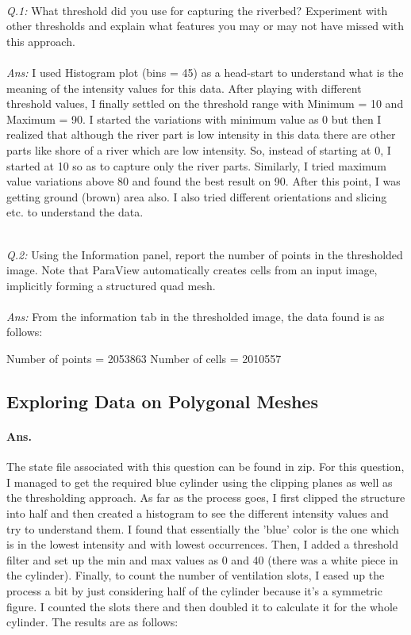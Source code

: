 \documentclass[a4paper,11pt]{article}
\theoremstyle{mytheor}
\begin{document}
\clearpage
\textit{\\ Q.1:} What threshold did you use for capturing the riverbed? Experiment with other thresholds and explain what features you may or may not have missed with this approach. \\ \\
\textit{Ans:} I used Histogram plot (bins = 45) as a head-start to understand what is the meaning of the intensity values for this data. After playing with different threshold values, I  finally settled on the threshold range with Minimum = 10 and Maximum = 90. I started the variations with minimum value as 0 but then I realized that although the river part is low intensity in this data there are other parts like shore of a river which are low intensity. So, instead of starting at 0, I started at 10 so as to capture only the river parts. Similarly, I tried maximum value variations above 80 and found the best result on 90. After this point, I was getting ground (brown) area also. I also tried different orientations and slicing etc. to understand the data. 

\textit{\\ Q.2:} Using the Information panel, report the number of points in the thresholded image. Note that ParaView automatically creates cells from an input image, implicitly forming a structured quad mesh. \\ \\
\textit{Ans:} From the information tab in the thresholded image, the data found is as follows:

Number of points = 2053863
Number of cells = 2010557

\clearpage

\subsection{Exploring Data on Polygonal Meshes}
\paragraph{Ans.} The state file associated with this question can be found in zip. For this question, I managed to get the required blue cylinder using the clipping planes as well as the thresholding approach. As far as the process goes, I first clipped the structure into half and then created a histogram to see the different intensity values and try to understand them. I found that essentially the 'blue' color is the one which is in the lowest intensity and with lowest occurrences. Then, I added a threshold filter and set up the min and max values as 0 and 40 (there was a white piece in the cylinder). Finally, to count the number of ventilation slots, I eased up the process a bit by just considering half of the cylinder because it's a symmetric figure. I counted the slots there and then doubled it to calculate it for the whole cylinder. The results are as follows:
\end{document}
